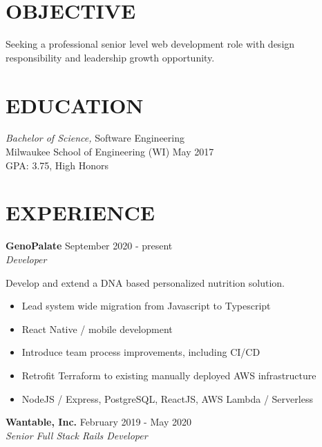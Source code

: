 \documentclass[line,margin]{res}
\begin{document}

\address{austin.dev@protonmail.com | (𝟺𝟷𝟺) 𝟹𝟹𝟺-𝟺𝟶𝟼𝟷}

\begin{resume}

\section{OBJECTIVE}
Seeking a professional senior level web development role with design responsibility and leadership growth opportunity.

\section{EDUCATION}
{\sl Bachelor of Science,} Software Engineering \\
Milwaukee School of Engineering (WI) \hfill May 2017 \\
GPA: 3.75, High Honors \\

\section{EXPERIENCE}

\textbf{GenoPalate} \hfill September 2020 - present \\
{\sl Developer}

Develop and extend a DNA based personalized nutrition solution.

\begin{itemize}
\item Lead system wide migration from Javascript to Typescript
\item React Native / mobile development
\item Introduce team process improvements, including CI/CD
\item Retrofit Terraform to existing manually deployed AWS infrastructure
\item NodeJS / Express, PostgreSQL, ReactJS, AWS Lambda / Serverless
\end{itemize}

\textbf{Wantable, Inc.} \hfill February 2019 - May 2020 \\
{\sl Senior Full Stack Rails Developer}


\end{resume}
\end{document}
